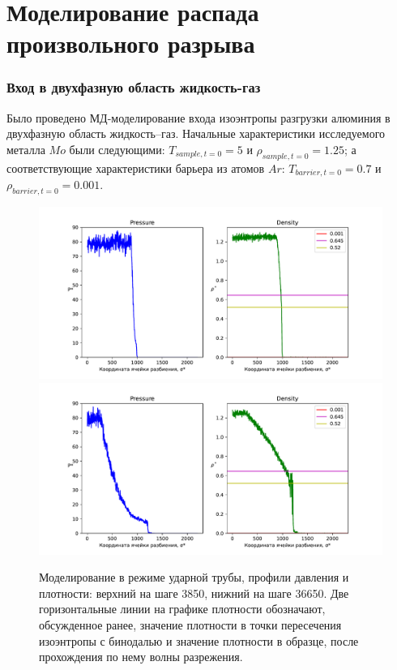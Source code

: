 \section{\label{sec 4}Моделирование распада произвольного разрыва}

\subsubsection{Вход в двухфазную область жидкость-газ}

Было проведено МД-моделирование входа изоэнтропы разгрузки алюминия в двухфазную область жидкость–газ. Начальные характеристики исследуемого металла $Mo$ были следующими: $T_{sample, t=0} = 5$ и $\rho_{sample, t=0} = 1.25$; а соответствующие характеристики барьера из атомов $Ar$: $T_{barrier, t=0} = 0.7$ и $\rho_{barrier, t=0} = 0.001$.

\begin{figure}[ht]
    \includegraphics[width=\linewidth]{img/example_0.001/relax_wave3850.pdf}
    \includegraphics[width=\linewidth]{img/example_0.001/relax_wave36650.pdf}
    \caption{\label{fig:s_0.001} Моделирование в режиме ударной трубы, профили давления и плотности: верхний на шаге 3850, нижний на шаге 36650. Две горизонтальные линии на графике плотности обозначают, обсужденное ранее, значение плотности в точки пересечения изоэнтропы с бинодалью и значение плотности в образце, после прохождения по нему волны разрежения.}
\end{figure}

